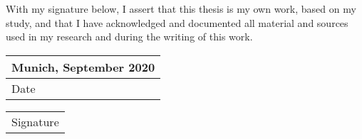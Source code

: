 \vspace{150 pt}
\begin{center}
    \begin{flushleft}
        With my signature below, I assert that this thesis is my own work, based on my study, and that I have acknowledged and documented all material and sources used in my research and during the writing of this work.
    \end{flushleft}
    
    \vspace{180 pt}

    \begin{tabular}{ l }
         Munich, September 2020 \\
         \hline
         Date \hspace{80 pt}    
    \end{tabular}
    \quad
    \begin{tabular}{ l }
         \\
         \hline
         Signature \hspace{100 pt}   
    \end{tabular}
\end{center}